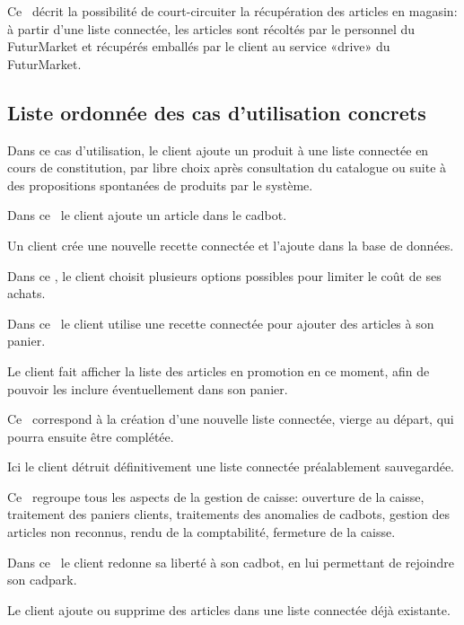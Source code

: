 Ce \cu\ décrit la possibilité de court-circuiter la récupération des articles en magasin: à partir d'une liste connectée, les articles sont récoltés par le personnel du FuturMarket et récupérés emballés par le client au service «drive» du FuturMarket.


\subsection{Liste ordonnée des cas d'utilisation concrets}

Dans ce cas d'utilisation, le client ajoute un produit à une liste connectée en cours de constitution, par libre choix après consultation du catalogue ou suite à des propositions spontanées de produits par le système.

Dans ce \cu\ le client ajoute un article dans le cadbot.

Un client crée une nouvelle recette connectée et l'ajoute dans la base de données.

Dans ce \cu, le client choisit plusieurs options possibles pour limiter le coût de ses achats.

Dans ce  \cu\ le client utilise une recette connectée pour ajouter des articles à son panier.

Le client fait afficher la liste des articles en promotion en ce moment, afin de pouvoir les inclure éventuellement dans son panier.

Ce \cu\ correspond à la création d'une nouvelle liste connectée, vierge au départ, qui pourra ensuite être complétée.

Ici le client détruit définitivement une liste connectée préalablement sauvegardée.

Ce \cu\ regroupe tous les aspects de la gestion de caisse: ouverture de la caisse, traitement des paniers clients, traitements des anomalies de cadbots, gestion des articles non reconnus, rendu de la comptabilité, fermeture de la caisse.

Dans ce \cu\ le client redonne sa liberté à son cadbot, en lui permettant de rejoindre son cadpark.

Le client ajoute ou supprime des articles dans une liste connectée déjà existante.

